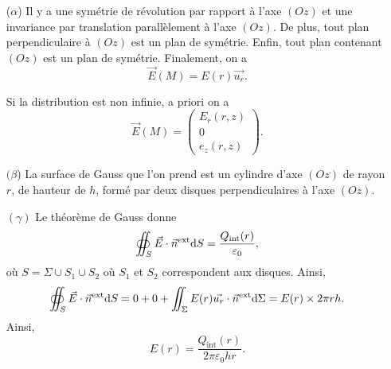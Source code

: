            \begin{itemize}
                \item [($\alpha$)] Il y a une symétrie de révolution par rapport à l'axe $(Oz)$ et une invariance par translation parallèlement à l'axe $(Oz)$. De plus, tout plan perpendiculaire à $(Oz)$ est un plan de symétrie. Enfin, tout plan contenant $(Oz)$ est un plan de symétrie. Finalement, on a 
                \begin{equation}
                    \boxed{
                    \vec{E}(M)=E(r)\vec{u_r}.
                    }
                \end{equation}
                \begin{remark}
                    Si la distribution est non infinie, a priori on a 
                    \begin{equation}
                        \vec{E}(M)=\begin{pmatrix}
                            E_r(r,z)\\0\\e_z(r,z)
                        \end{pmatrix}.
                    \end{equation}
                \end{remark}

                \item [$(\beta$)] La surface de Gauss que l'on prend est un cylindre d'axe $(Oz)$ de rayon $r$, de hauteur de $h$, formé par deux disques perpendiculaires à l'axe $(Oz)$.
                
                \item [$(\gamma)$] Le théorème de Gauss donne
                \begin{equation}
                    \oiint_{S}\vec{E}\cdot\vec{n}^{\text{ext}}\mathrm{d} S=\frac{Q_{\text{int}}(r)}{\varepsilon_{0}},
                \end{equation}
                où $S=\Sigma\cup S_1\cup S_2$ où $S_1$ et $S_2$ correspondent aux disques. Ainsi, 
                \begin{equation}
                    \oiint_{S}\vec{E}\cdot\vec{n}^{\text{ext}}\mathrm{d} S=0+0+\iint_{\Sigma}E(r)\vec{u_r}\cdot\vec{n}^{\text{ext}}\mathrm{d} \Sigma=E(r)\times 2\pi r h.
                \end{equation}
                Ainsi,
                \begin{equation}
                    \boxed{
                        E(r)=\frac{Q_{\text{int}}(r)}{2\pi\varepsilon_{0}hr}.
                    }
                \end{equation}

            \end{itemize}

